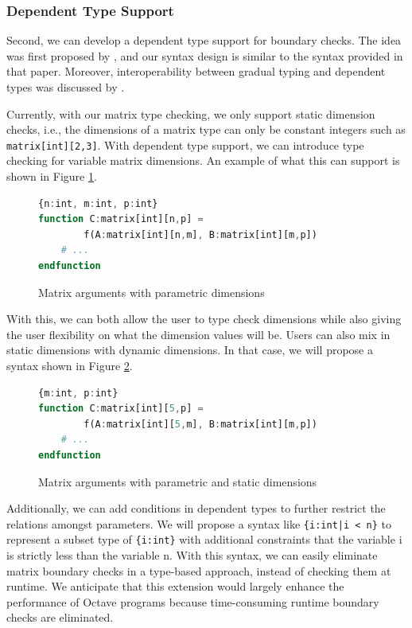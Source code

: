 \subsubsection{Dependent Type Support}
Second, we can develop a dependent type support for boundary checks. The idea was first proposed by \citet{xi1998eliminating}, and our syntax design is similar to the syntax provided in that paper. Moreover, interoperability between gradual typing and dependent types was discussed by \citet{lehmann2017gradual}.

Currently, with our matrix type checking, we only support static dimension checks, i.e., the dimensions of a matrix type can only be constant integers such as {\tt matrix[int][2,3]}. With dependent type support, we can introduce type checking for variable matrix dimensions. An example of what this can support is shown in Figure \ref{fig:variableDimensions}.

\begin{figure}[h]
    \begin{lstlisting}[language=octave]
{n:int, m:int, p:int}
function C:matrix[int][n,p] =
        f(A:matrix[int][n,m], B:matrix[int][m,p])
    # ...
endfunction
    \end{lstlisting}
    \caption[]{{Matrix arguments with parametric dimensions}}
    \label{fig:variableDimensions}
\end{figure}

With this, we can both allow the user to type check dimensions while also giving the user flexibility on what the dimension values will be. Users can also mix in static dimensions with dynamic dimensions. In that case, we will propose a syntax shown in Figure \ref{fig:variableAndStaticDimensions}.

\begin{figure}[h]
    \begin{lstlisting}[language=octave]
{m:int, p:int}
function C:matrix[int][5,p] = 
        f(A:matrix[int][5,m], B:matrix[int][m,p])
    # ...
endfunction
    \end{lstlisting}
    \caption[]{{Matrix arguments with parametric and static dimensions}}
    \label{fig:variableAndStaticDimensions}
\end{figure}

Additionally, we can add conditions in dependent types to further restrict the relations amongst parameters. We will propose a syntax like {\tt \{i:int|i < n\}} to represent a subset type of {\tt \{i:int\}} with additional constraints that the variable i is strictly less than the variable n. With this syntax, we can easily eliminate matrix boundary checks in a type-based approach, instead of checking them at runtime. We anticipate that this extension would largely enhance the performance of Octave programs because time-consuming runtime boundary checks are eliminated.

